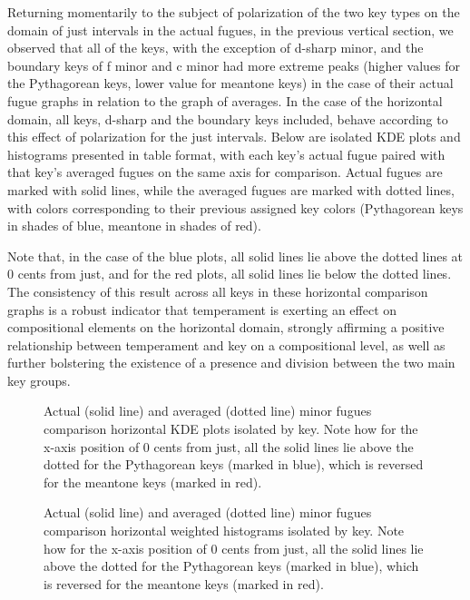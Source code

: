 Returning momentarily to the subject of polarization of the two key
types on the domain of just intervals in the actual fugues, in the
previous vertical section, we observed that all of the keys, with the
exception of d-sharp minor, and the boundary keys of f minor and c minor
had more extreme peaks (higher values for the Pythagorean keys, lower
value for meantone keys) in the case of their actual fugue graphs in
relation to the graph of averages. In the case of the horizontal domain,
all keys, d-sharp and the boundary keys included, behave according to
this effect of polarization for the just intervals. Below are isolated
KDE plots and histograms presented in table format, with each key's
actual fugue paired with that key's averaged fugues on the same axis for
comparison. Actual fugues are marked with solid lines, while the
averaged fugues are marked with dotted lines, with colors corresponding
to their previous assigned key colors (Pythagorean keys in shades of
blue, meantone in shades of red).

Note that, in the case of the blue plots, all solid lines lie above the
dotted lines at 0 cents from just, and for the red plots, all solid
lines lie below the dotted lines. The consistency of this result across
all keys in these horizontal comparison graphs is a robust indicator
that temperament is exerting an effect on compositional elements on the
horizontal domain, strongly affirming a positive relationship between
temperament and key on a compositional level, as well as further
bolstering the existence of a presence and division between the two main
key groups.




\begin{figure}[H]
    \begin{center}
    \caption[Actual and Averaged Minor Fugues Comparison Horizontal KDE Plots Isolated by Key. ]{Actual (solid line) and averaged (dotted line) minor fugues comparison horizontal KDE plots isolated by key. Note how for the x-axis position of 0 cents from just, all the solid lines lie above the dotted for the Pythagorean keys (marked in blue), which is reversed for the meantone keys (marked in red).}
    \end{center}
\end{figure}
    



\begin{figure}[H]
    \begin{center}
    \caption[Actual and Averaged Minor Fugues Comparison Horizontal Weighted Histograms Isolated by Key. ]{Actual (solid line) and averaged (dotted line) minor fugues comparison horizontal weighted histograms isolated by key. Note how for the x-axis position of 0 cents from just, all the solid lines lie above the dotted for the Pythagorean keys (marked in blue), which is reversed for the meantone keys (marked in red).}
    \end{center}
\end{figure}
    
